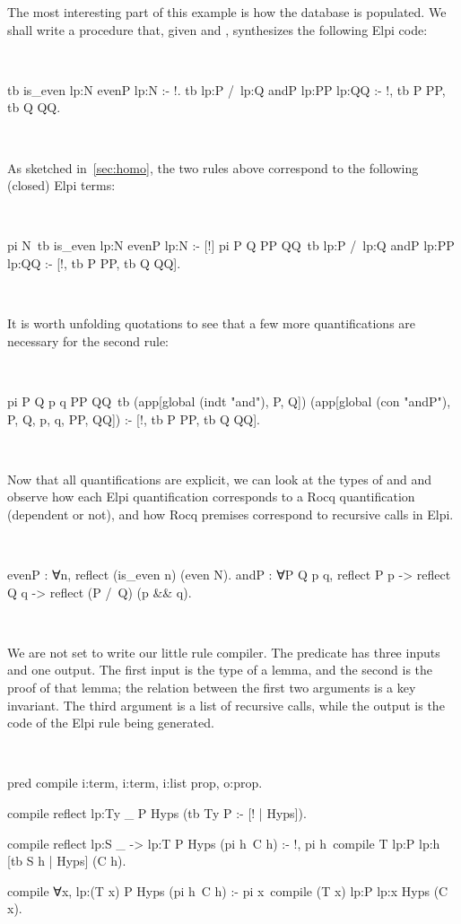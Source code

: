 \documentclass[a4paper, 11pt]{book}
\newenvironment{elpicode}
  {\VerbatimEnvironment~\\\begin{elpibox}\begin{xelpicode}}{\end{xelpicode}
\end{elpibox}\\}
\newenvironment{rocqcode}
  {\VerbatimEnvironment~\\\begin{rocqbox}\begin{xrocqcode}}{\end{xrocqcode}
\end{rocqbox}\\}
\begin{document}
The most interesting part of this example is how the database is populated.
We shall write a  procedure that, given  and
, synthesizes the following Elpi code:

\begin{elpicode}
tb {{ is_even lp:N }} {{ evenP lp:N }} :- !.
tb {{ lp:P /\ lp:Q }} {{ andP lp:PP lp:QQ }} :- !, tb P PP, tb Q QQ.
\end{elpicode}


As sketched in~\cref{sec:homo}, the two rules above correspond to the
following (closed) Elpi terms:

\begin{elpicode}
pi N\ tb {{ is_even lp:N }} {{ evenP lp:N }} :- [!]
pi P Q PP QQ\ tb {{ lp:P /\ lp:Q }} {{ andP lp:PP lp:QQ }} :-
  [!, tb P PP, tb Q QQ].
\end{elpicode}


It is worth unfolding quotations to see that a few more quantifications are
necessary for the second rule:

\begin{elpicode}
pi P Q p q PP QQ\
  tb (app[global (indt "and"), P, Q])
     (app[global (con "andP"), P, Q, p, q, PP, QQ]) :-
  [!, tb P PP, tb Q QQ].
\end{elpicode}
  


Now that all quantifications are explicit, we can look at the types of
\rocq{evenP} and \rocq{andP} and observe how each \elpi{pi} Elpi
quantification corresponds to a Rocq quantification (dependent or not), and
how Rocq premises correspond to recursive calls in Elpi.

\begin{rocqcode}
evenP : ∀n, reflect (is_even n) (even N).
andP : ∀P Q p q,
  reflect P p -> reflect Q q -> reflect (P /\ Q) (p && q).
\end{rocqcode}

We are not set to write our little rule compiler.
The  predicate has three inputs and one output. The first input
is the type of a lemma, and the second is the proof of that lemma; the
relation between the first two arguments is a key invariant. The third
argument is a list of recursive calls, while the output is the code of the
Elpi rule being generated.

\begin{elpicode}
pred compile i:term, i:term, i:list prop, o:prop.

compile {{ reflect lp:Ty _ }} P Hyps (tb Ty P :- [! | Hyps]).

compile {{ reflect lp:S _ -> lp:T }} P Hyps (pi h\ C h) :- !,
  pi h\ compile T {{ lp:P lp:h }} [tb S h | Hyps] (C h).

compile {{ ∀x, lp:(T x) }} P Hyps (pi h\ C h) :-
  pi x\ compile (T x) {{ lp:P lp:x }} Hyps (C x).
\end{elpicode}
\end{document}
